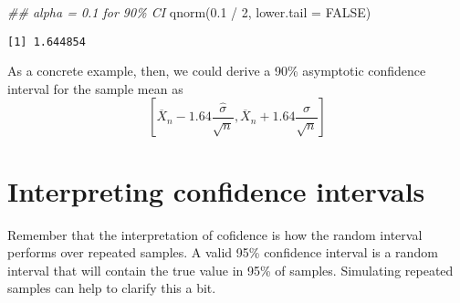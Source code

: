 \documentclass[
  letterpaper,
  DIV=11,
  numbers=noendperiod]{scrreprt}
\newenvironment{Shaded}{\begin{snugshade}}{\end{snugshade}}
\newcommand{\AttributeTok}[1]{\textcolor[rgb]{0.40,0.45,0.13}{#1}}
\newcommand{\ConstantTok}[1]{\textcolor[rgb]{0.56,0.35,0.01}{#1}}
\newcommand{\DecValTok}[1]{\textcolor[rgb]{0.68,0.00,0.00}{#1}}
\newcommand{\DocumentationTok}[1]{\textcolor[rgb]{0.37,0.37,0.37}{\textit{#1}}}
\newcommand{\FloatTok}[1]{\textcolor[rgb]{0.68,0.00,0.00}{#1}}
\newcommand{\FunctionTok}[1]{\textcolor[rgb]{0.28,0.35,0.67}{#1}}
\newcommand{\NormalTok}[1]{\textcolor[rgb]{0.00,0.23,0.31}{#1}}
\newcommand{\SpecialCharTok}[1]{\textcolor[rgb]{0.37,0.37,0.37}{#1}}
\newcommand{\Xbar}{\overline{X}}
\theoremstyle{definition}
\theoremstyle{plain}
\theoremstyle{definition}
\theoremstyle{remark}
\begin{document}
\begin{Shaded}
\begin{Highlighting}[]
\DocumentationTok{\#\# alpha = 0.1 for 90\% CI}
\FunctionTok{qnorm}\NormalTok{(}\FloatTok{0.1} \SpecialCharTok{/} \DecValTok{2}\NormalTok{, }\AttributeTok{lower.tail =} \ConstantTok{FALSE}\NormalTok{)}
\end{Highlighting}
\end{Shaded}

\begin{verbatim}
[1] 1.644854
\end{verbatim}

As a concrete example, then, we could derive a 90\% asymptotic
confidence interval for the sample mean as \[ 
\left[\Xbar_{n} - 1.64 \frac{\widehat{\sigma}}{\sqrt{n}}, \Xbar_{n} + 1.64 \frac{\widehat{\sigma}}{\sqrt{n}}\right]
\]

\hypertarget{interpreting-confidence-intervals}{%
\section{Interpreting confidence
intervals}\label{interpreting-confidence-intervals}}

Remember that the interpretation of cofidence is how the random interval
performs over repeated samples. A valid 95\% confidence interval is a
random interval that will contain the true value in 95\% of samples.
Simulating repeated samples can help to clarify this a bit.
\end{document}
